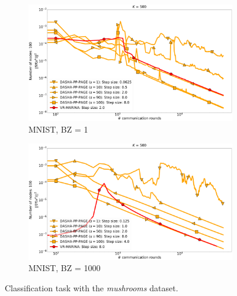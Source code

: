 \documentclass{article}
\begin{document}
\begin{figure}[h]
    \begin{subfigure}{.5\textwidth}
        \includegraphics[width=\textwidth]{neurips_2022_finite_sum_real-sim_nof_500_numnodes_100_more_probs_batch_size_1.pdf}
        \caption{MNIST, BZ = 1}
    \end{subfigure}
    \begin{subfigure}{.5\textwidth}
        \includegraphics[width=\textwidth]{neurips_2022_finite_sum_real-sim_nof_500_numnodes_100_more_probs_batch_size_1000.pdf}
        \caption{MNIST, BZ = 1000}
    \end{subfigure}
\caption{Classification task with the \textit{mushrooms} dataset.}
\label{fig:finite-sum-real-sim}
\end{figure}

\clearpage
\end{document}
